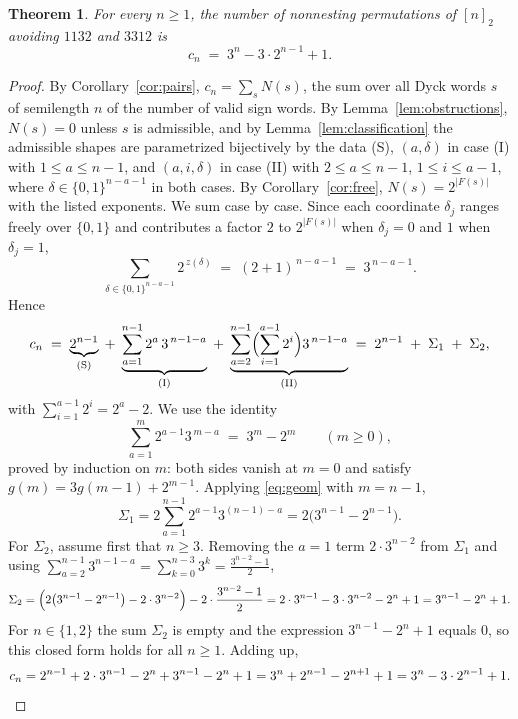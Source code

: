 \documentclass[11pt]{article}
\newtheorem{theorem}{Theorem}[section]
\theoremstyle{definition}
\theoremstyle{remark}
\newcommand{\nn}{[n]_2}
\begin{document}
\begin{theorem}\label{thm:main}
For every $n\ge1$, the number of nonnesting permutations of $\nn$ avoiding
$1132$ and $3312$ is
\[
  c_n \;=\; 3^n-3\cdot2^{n-1}+1 .
\]
\end{theorem}

\begin{proof}
By Corollary~\ref{cor:pairs}, $c_n=\sum_s N(s)$, the sum over all Dyck
words $s$ of semilength $n$ of the number of valid sign words. By
Lemma~\ref{lem:obstructions}, $N(s)=0$ unless $s$ is admissible, and by
Lemma~\ref{lem:classification} the admissible shapes are parametrized
bijectively by the data (S), $(a,\delta)$ in case (I) with $1\le a\le n-1$,
and $(a,i,\delta)$ in case (II) with $2\le a\le n-1$, $1\le i\le a-1$,
where $\delta\in\{0,1\}^{n-a-1}$ in both cases. By
Corollary~\ref{cor:free}, $N(s)=2^{|F(s)|}$ with the listed exponents. We
sum case by case. Since each coordinate $\delta_j$ ranges freely over
$\{0,1\}$ and contributes a factor $2$ to $2^{|F(s)|}$ when $\delta_j=0$
and $1$ when $\delta_j=1$,
\[
 \sum_{\delta\in\{0,1\}^{n-a-1}} 2^{\,z(\delta)} \;=\; (2+1)^{\,n-a-1} \;=\;
 3^{\,n-a-1}.
\]
Hence
\[
  c_n \;=\; \underbrace{2^{n-1}}_{\text{(S)}}
  \;+\; \underbrace{\sum_{a=1}^{n-1} 2^{a}\,3^{\,n-1-a}}_{\text{(I)}}
  \;+\; \underbrace{\sum_{a=2}^{n-1}\Bigl(\sum_{i=1}^{a-1}2^{i}\Bigr)3^{\,n-1-a}}_{\text{(II)}}
  \;=\; 2^{n-1} \;+\; \Sigma_1 \;+\; \Sigma_2,
\]
with $\sum_{i=1}^{a-1}2^i=2^a-2$. We use the identity
\begin{equation}\label{eq:geom}
  \sum_{a=1}^{m} 2^{a-1}3^{\,m-a} \;=\; 3^m-2^m \qquad (m\ge0),
\end{equation}
proved by induction on $m$: both sides vanish at $m=0$ and satisfy
$g(m)=3g(m-1)+2^{m-1}$. Applying \eqref{eq:geom} with $m=n-1$,
\[
  \Sigma_1=2\sum_{a=1}^{n-1}2^{a-1}3^{(n-1)-a}=2\bigl(3^{n-1}-2^{n-1}\bigr).
\]
For $\Sigma_2$, assume first that $n\ge3$. Removing the $a=1$ term
$2\cdot3^{n-2}$ from $\Sigma_1$ and using
$\sum_{a=2}^{n-1}3^{n-1-a}=\sum_{k=0}^{n-3}3^k=\tfrac{3^{n-2}-1}{2}$,
\[
  \Sigma_2=\Bigl(2\bigl(3^{n-1}-2^{n-1}\bigr)-2\cdot3^{n-2}\Bigr)
  -2\cdot\frac{3^{n-2}-1}{2}
  =2\cdot3^{n-1}-3\cdot 3^{n-2}-2^{n}+1
  =3^{n-1}-2^{n}+1 .
\]
For $n\in\{1,2\}$ the sum $\Sigma_2$ is empty and the expression
$3^{n-1}-2^n+1$ equals $0$, so this closed form holds for all $n\ge1$.
Adding up,
\[
  c_n=2^{n-1}+2\cdot3^{n-1}-2^{n}+3^{n-1}-2^{n}+1
     =3^{n}+2^{n-1}-2^{n+1}+1
     =3^{n}-3\cdot2^{n-1}+1 . \qedhere
\]
\end{proof}
\end{document}
